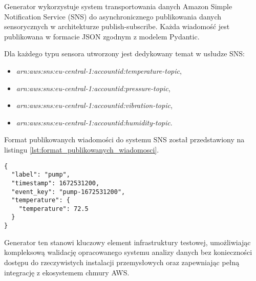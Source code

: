 Generator wykorzystuje system transportowania danych Amazon Simple Notification Service (SNS) do asynchronicznego publikowania danych sensorycznych w architekturze publish-subscribe. Każda wiadomość jest publikowana w formacie JSON zgodnym z modelem Pydantic.

\vspace{0.3em}

Dla każdego typu sensora utworzony jest dedykowany temat w usłudze SNS:

\begin{itemize}
    \item \textit{arn:aws:sns:eu-central-1:accountid:temperature-topic},
    \item \textit{arn:aws:sns:eu-central-1:accountid:pressure-topic},
    \item \textit{arn:aws:sns:eu-central-1:accountid:vibration-topic},
    \item \textit{arn:aws:sns:eu-central-1:accountid:humidity-topic}.
\end{itemize}

\newpage

Format publikowanych wiadomości do systemu SNS został przedstawiony na listingu \ref{lst:format_publikowanych_wiadomosci}.

\begin{lstlisting}[caption=Format publikowanych wiadomości, label={lst:format_publikowanych_wiadomosci}]
{
  "label": "pump",
  "timestamp": 1672531200,
  "event_key": "pump-1672531200",
  "temperature": {
    "temperature": 72.5
  }
}
\end{lstlisting}


Generator ten stanowi kluczowy element infrastruktury testowej, umożliwiając kompleksową walidację opracowanego systemu analizy danych bez konieczności dostępu do rzeczywistych instalacji przemysłowych oraz zapewniając pełną integrację z ekosystemem chmury AWS.